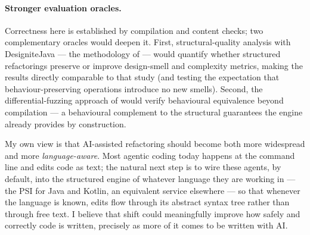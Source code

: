 \paragraph{Stronger evaluation oracles.} Correctness here is established by
compilation and content checks; two complementary oracles would deepen it. First,
structural-quality analysis with DesigniteJava --- the methodology of
\citet{agenticrefactoring2025} --- would quantify whether structured refactorings
preserve or improve design-smell and complexity metrics, making the results
directly comparable to that study (and testing the expectation that
behaviour-preserving operations introduce no new smells). Second, the
differential-fuzzing approach of \citet{difffuzzing2026} would verify behavioural
equivalence beyond compilation --- a behavioural complement to the structural
guarantees the engine already provides by construction.

My own view is that AI-assisted refactoring should become both more widespread and more
\emph{language-aware}. Most agentic coding today happens at the command line and edits
code as text; the natural next step is to wire these agents, by default, into the
structured engine of whatever language they are working in --- the PSI for Java and
Kotlin, an equivalent service elsewhere --- so that whenever the language is known, edits
flow through its abstract syntax tree rather than through free text. I believe that shift
could meaningfully improve how safely and correctly code is written, precisely as more of
it comes to be written with AI.
